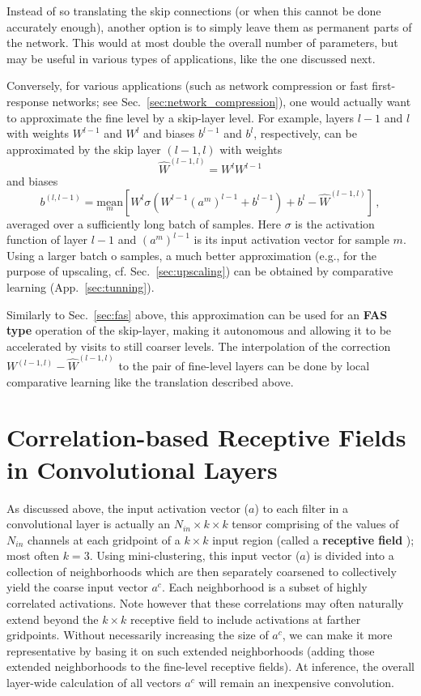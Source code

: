 \documentclass{article} %
\begin{document}
Instead of so translating the skip connections (or when this cannot be done accurately enough), another option is to simply leave them as permanent parts of the network. This would at most double the overall number of parameters, but may be useful in various types of applications, like the one discussed next.

Conversely, for various applications (such as network compression or fast first-response networks; see Sec.~\ref{sec:network_compression}), one would actually want to approximate the fine level by a skip-layer level. For example, layers $l-1$ and $l$ with weights $W^{l-1}$ and $W^l$ and biases $b^{l-1}$ and $b^l$, respectively, can be approximated by the skip layer $(l-1,l)$ with weights
$$ \hat{W}^{(l-1,l)} = W^l W^{l-1} $$
and biases
$$ b^{(l,l-1)} = \underset{m}{\mathrm{mean}} \left[ W^l \sigma(W^{l-1}(a^m)^{l-1} + b^{l-1}) + b^l - \hat{W}^{(l-1,l)} \right]\,,$$
averaged over a sufficiently long batch of samples. Here $\sigma$ is the activation function of layer $l-1$ and $(a^m)^{l-1}$ is its input activation vector for sample $m$. Using a larger batch o samples, a much better approximation (e.g., for the purpose of upscaling, cf. Sec.~\ref{sec:upscaling}) can be obtained by comparative learning (App.~\ref{sec:tunning}).

Similarly to Sec.~\ref{sec:fas} above, this approximation can be used for an \textbf{FAS type} operation of the skip-layer, making it autonomous and allowing it to be accelerated by visits to still coarser levels. The interpolation of the correction $ W^{(l-1,l)}  - \hat{W}^{(l-1,l)}$ to the pair of fine-level layers can be done by local comparative learning like the translation described above.


\section{Correlation-based Receptive Fields in Convolutional Layers}
\label{sec:extended_region}

As discussed above, the input activation vector ($a$) to each filter in a convolutional layer is actually an $N_{in} \times k \times k$ tensor comprising of the values of $N_{in}$ channels at each gridpoint of a $k \times k$ input region (called a \textbf{receptive field} \cite[Sec~.6]{Goodfellow-et-al-2016}); most often $k = 3$. Using mini-clustering, this input vector ($a$) is divided into a collection of neighborhoods which are then separately coarsened to collectively yield the coarse input vector $a^c$. Each neighborhood is a subset of highly correlated activations. Note however that these correlations may often naturally extend beyond the $k \times k$ receptive field to include activations at farther gridpoints. Without necessarily increasing the size of $a^c$, we can make it more representative by basing it on such extended neighborhoods (adding those extended neighborhoods to the fine-level receptive fields). At inference, the overall layer-wide calculation of all vectors $a^c$ will remain an inexpensive convolution.
\end{document}

